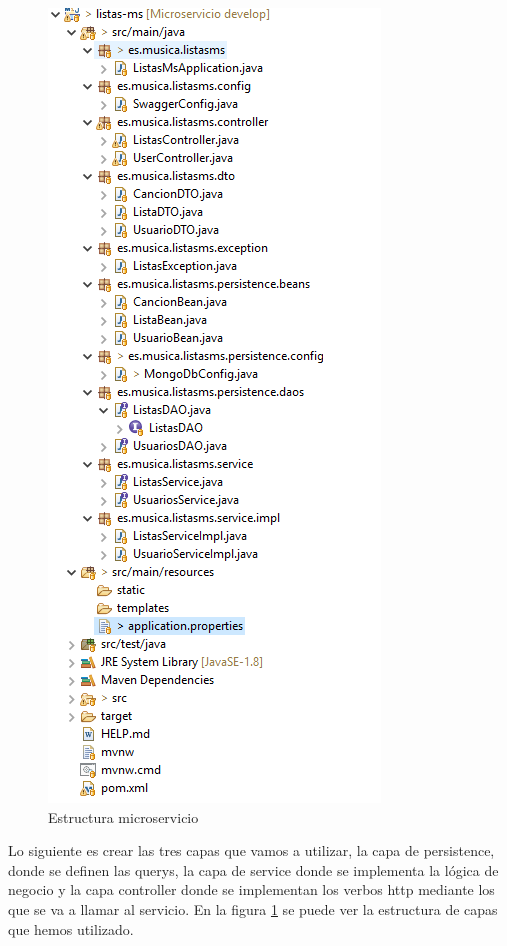 \documentclass[12pt]{report} %
\begin{document}
\begin{figure}
	\centering
	\includegraphics[width=0.7\linewidth]{imagenes/estructuramicroservicio}
	\caption{Estructura microservicio}
	\label{fig:estructura-microservicio}
\end{figure}

 Lo siguiente es crear las tres capas que vamos a utilizar, la capa de persistence, donde se definen las querys, la capa de service donde se implementa la lógica de negocio y la capa controller donde se implementan los verbos http mediante los que se va a llamar al servicio. En la figura \ref{fig:estructura-microservicio} se puede ver la estructura de capas que hemos utilizado.
 
\end{document}
